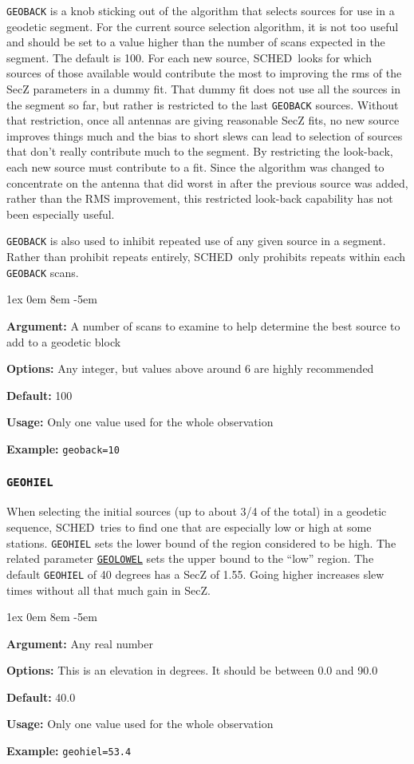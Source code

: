\documentclass{report}
\newcommand{\schedb}{{\sc SCHED~}}
\newcommand{\rcwbox}[5]{
  \begin{list}{}{\parsep 1ex  \itemsep 0em
                 \leftmargin 8em  \itemindent -5em }
    \item {\bf Argument:} #1
    \item {\bf Options:}  #2
    \item {\bf Default:}  #3
    \item {\bf Usage:}    #4
    \item {\bf Example:}  #5
  \end{list}
}
\begin{document}
{\tt GEOBACK} is a knob sticking out of the algorithm that selects
sources for use in a geodetic segment.  For the current source
selection algorithm, it is not too useful and should be set to a value
higher than the number of scans expected in the segment.  The default
is 100.  For each new source, \schedb looks for which sources of those
available would contribute the most to improving the rms of the SecZ
parameters in a dummy fit.  That dummy fit does not use all the
sources in the segment so far, but rather is restricted to the last
{\tt GEOBACK} sources.  Without that restriction, once all antennas
are giving reasonable SecZ fits, no new source improves things much
and the bias to short slews can lead to selection of sources that
don't really contribute much to the segment.  By restricting the
look-back, each new source must contribute to a fit.  Since the
algorithm was changed to concentrate on the antenna that did worst in
after the previous source was added, rather than the RMS improvement,
this restricted look-back capability has not been especially useful.

{\tt GEOBACK} is also used to inhibit repeated use of any given source
in a segment.  Rather than prohibit repeats entirely, \schedb only
prohibits repeats within each {\tt GEOBACK} scans.

\rcwbox
{A number of scans to examine to help determine the best source to add
to a geodetic block}
{Any integer, but values above around 6 are highly recommended}
{100}
{Only one value used for the whole observation}
{{\tt geoback=10}}

\subsubsection{\label{MP:GEOHIEL}{\tt GEOHIEL}}

When selecting the initial sources (up to about 3/4 of the total)
in a geodetic sequence, \schedb tries to find one that are especially
low or high at some stations.  {\tt GEOHIEL} sets the lower bound
of the region considered to be high.  The related parameter
{\hyperref[MP:GEOLOWEL]{{\tt GEOLOWEL}}} sets the upper bound to the
``low'' region.  The default {\tt GEOHIEL} of 40 degrees has a
SecZ of 1.55.  Going higher increases slew times without all that
much gain in SecZ.

\rcwbox
{Any real number}
{This is an elevation in degrees.  It should be between 0.0 and 90.0}
{40.0}
{Only one value used for the whole observation}
{{\tt geohiel=53.4}}
\end{document}
